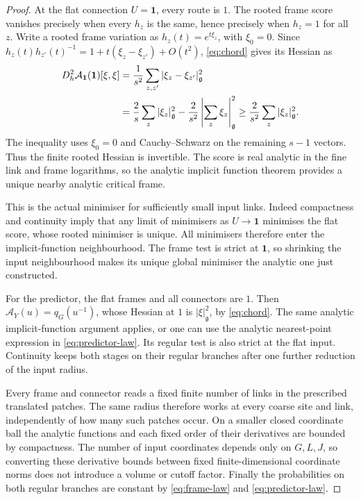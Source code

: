 \documentclass[11pt,reqno]{amsart}
\numberwithin{equation}{section}
\theoremstyle{definition}
\theoremstyle{remark}
\newcommand{\g}{\mathfrak g}
\begin{document}
\begin{proof}
At the flat connection \(U=\mathbf1\), every route is \(1\).
The rooted frame score vanishes precisely when every \(h_z\)
is the same, hence precisely when \(h_z=1\) for all \(z\).
Write a rooted frame variation as \(h_z(t)=e^{t\xi_z}\),
with \(\xi_0=0\). Since
\(h_z(t)h_{z'}(t)^{-1}=1+t(\xi_z-\xi_{z'})+O(t^2)\),
\eqref{eq:chord} gives its Hessian as
\begin{align}
 D_h^2\mathcal A_{\mathbf1}(\mathbf1)[\xi,\xi]
 &=\frac1{s^2}\sum_{z,z'}|\xi_z-\xi_{z'}|_{\g}^2\notag\\
 &=\frac2s\sum_z|\xi_z|_{\g}^2
       -\frac2{s^2}\left|\sum_z\xi_z\right|_{\g}^2
 \ge\frac2{s^2}\sum_z|\xi_z|_{\g}^2.
 \label{eq:frame-flat-hessian}
\end{align}
The inequality uses \(\xi_0=0\) and Cauchy--Schwarz on the
remaining \(s-1\) vectors. Thus the finite rooted Hessian is
invertible. The score is real analytic in the fine link and frame
logarithms, so the analytic implicit function theorem provides
a unique nearby analytic critical frame.

This is the actual minimiser for sufficiently small input links.
Indeed compactness and continuity imply that any limit of
minimisers as \(U\to\mathbf1\) minimises the flat score, whose
rooted minimiser is unique. All minimisers therefore enter the
implicit-function neighbourhood. The frame test is strict at
\(\mathbf1\), so shrinking the input neighbourhood makes its
unique global minimiser the analytic one just constructed.

For the predictor, the flat frames and all connectors are \(1\).
Then \(\mathcal A_Y(u)=q_G(u^{-1})\), whose Hessian at \(1\)
is \(|\xi|_{\g}^2\), by \eqref{eq:chord}.
The same analytic implicit-function argument applies, or one
can use the analytic nearest-point expression in
\eqref{eq:predictor-law}. Its regular test is also strict at
the flat input. Continuity keeps both stages on their regular
branches after one further reduction of the input radius.

Every frame and connector reads a fixed finite number of links
in the prescribed translated patches. The same radius therefore
works at every coarse site and link, independently of how many
such patches occur. On a smaller closed coordinate ball the
analytic functions and each fixed order of their derivatives are
bounded by compactness. The number of input coordinates depends
only on \(G,L,J\), so converting these derivative bounds between
fixed finite-dimensional coordinate norms does not introduce a
volume or cutoff factor. Finally the probabilities on both regular
branches are constant by \eqref{eq:frame-law} and
\eqref{eq:predictor-law}.
\end{proof}
\end{document}
